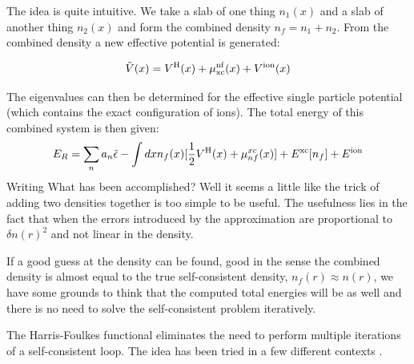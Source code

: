 The idea is quite intuitive. We take a slab of one thing $n_{1}(x)$ 
and a slab of another thing $n_{2}(x)$ and form the combined density 
$n_{f}= n_1 + n_2$. From the combined density a new effective potential
is generated:

\begin{equation}
\tilde{V}(x) = V^{\rm H}(x) + \mu^{\rm nf}_{\rm xc}(x) + V^{\rm ion}(x)
\end{equation}

The eigenvalues can then be determined for the effective single particle
potential (which contains the exact configuration of ions). 
The total energy of this combined system is then given:
%
\begin{equation}
E_{R} = \sum_{n}a_{n}\tilde{\epsilon} - \int dx n_{f}(x)[\frac{1}{2}V^{\rm H}(x) + \mu_{nf}^{xc}(x)] + E^{\rm xc}[n_f]+ E^{\rm ion}
\end{equation}
%
Writing 
What has been accomplished? Well it seems a little like the trick of adding
two densities together is too simple to be useful. The usefulness lies in the
fact that when the errors introduced by the approximation 
are proportional to $\delta n(r)^2$ and not linear in the density. 

If a good guess at the density can be found, good in the sense the combined 
density is almost equal to the true self-consistent 
density, $n_{f}(r) \approx n(r)$, we have some 
grounds to think that the computed total energies will be as well
and there is no need to solve the self-consistent problem iteratively.


The Harris-Foulkes functional eliminates the need to perform multiple iterations
of a self-consistent loop. The idea has been tried in a few different contexts
\cite{harris85, foulkes87, foulkes89, haydock97}.

